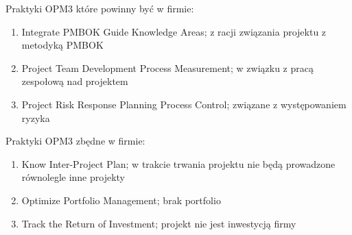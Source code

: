 Praktyki OPM3 które powinny być w firmie:

\begin{enumerate}

\item Integrate PMBOK Guide Knowledge Areas; z racji związania projektu z metodyką PMBOK

\item Project Team Development Process Measurement; w związku z pracą zespołową nad projektem

\item Project Risk Response Planning Process Control; związane z występowaniem ryzyka

\end{enumerate}

Praktyki OPM3 zbędne w firmie:

\begin{enumerate}

\item Know Inter-Project Plan; w trakcie trwania projektu nie będą prowadzone równolegle inne projekty

\item Optimize Portfolio Management; brak portfolio

\item Track the Return of Investment; projekt nie jest inwestycją firmy

\end{enumerate}

